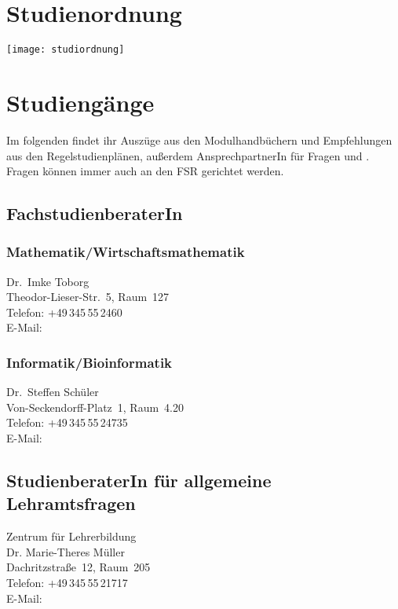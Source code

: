 
\section{Studienordnung}
\begin{center}
	\texttt{[image: studiordnung]}
\end{center}

\section{Studiengänge}

Im folgenden findet ihr Auszüge aus den Modulhandbüchern und Empfehlungen aus den Regelstudienplänen, außerdem AnsprechpartnerIn für Fragen und .
Fragen können immer auch an den FSR gerichtet werden.

\subsection{FachstudienberaterIn}
\subsubsection{Mathematik/Wirtschaftsmathematik}
Dr.\ Imke Toborg \\
Theodor-Lieser-Str.~5, Raum~127 \\
Telefon: +49\,345\,55\,2460\\
E-Mail: \\

\subsubsection{Informatik/Bioinformatik}
Dr.\ Steffen Schüler \\
Von-Seckendorff-Platz~1, Raum~4.20 \\
Telefon: +49\,345\,55\,24735 \\
E-Mail: 

\subsection{StudienberaterIn für allgemeine Lehramtsfragen}

Zentrum für Lehrerbildung \\
Dr. Marie-Theres Müller \\
Dachritzstraße~12, Raum~205 \\
Telefon: +49\,345\,55\,21717 \\
E-Mail: 

